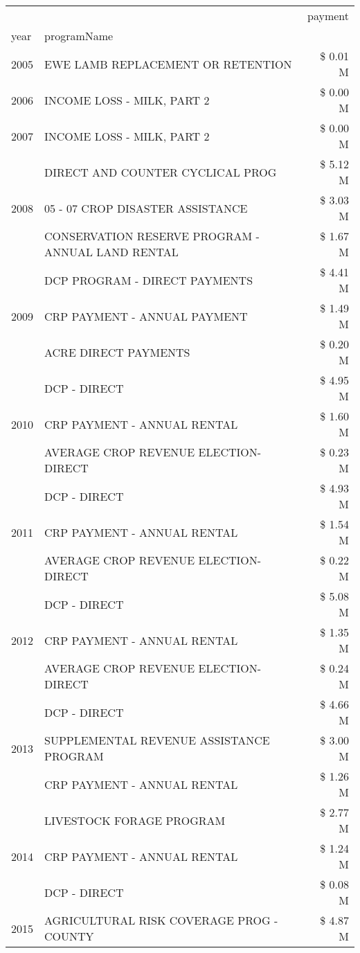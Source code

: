 \begin{tabular}{llr}
\toprule
 &  & payment \\
year & programName &  \\
\midrule
2005 & EWE LAMB REPLACEMENT OR RETENTION & \$ 0.01 M \\
\cline{1-3}
2006 & INCOME LOSS - MILK, PART 2 & \$ 0.00 M \\
\cline{1-3}
2007 & INCOME LOSS - MILK, PART 2 & \$ 0.00 M \\
\cline{1-3}
\multirow[t]{3}{*}{2008} & DIRECT AND COUNTER CYCLICAL PROG & \$ 5.12 M \\
 & 05 - 07 CROP DISASTER ASSISTANCE & \$ 3.03 M \\
 & CONSERVATION RESERVE PROGRAM - ANNUAL LAND RENTAL & \$ 1.67 M \\
\cline{1-3}
\multirow[t]{3}{*}{2009} & DCP PROGRAM - DIRECT PAYMENTS & \$ 4.41 M \\
 & CRP PAYMENT - ANNUAL PAYMENT & \$ 1.49 M \\
 & ACRE DIRECT PAYMENTS & \$ 0.20 M \\
\cline{1-3}
\multirow[t]{3}{*}{2010} & DCP - DIRECT & \$ 4.95 M \\
 & CRP PAYMENT - ANNUAL RENTAL & \$ 1.60 M \\
 & AVERAGE CROP REVENUE ELECTION-DIRECT & \$ 0.23 M \\
\cline{1-3}
\multirow[t]{3}{*}{2011} & DCP - DIRECT & \$ 4.93 M \\
 & CRP PAYMENT - ANNUAL RENTAL & \$ 1.54 M \\
 & AVERAGE CROP REVENUE ELECTION-DIRECT & \$ 0.22 M \\
\cline{1-3}
\multirow[t]{3}{*}{2012} & DCP - DIRECT & \$ 5.08 M \\
 & CRP PAYMENT - ANNUAL RENTAL & \$ 1.35 M \\
 & AVERAGE CROP REVENUE ELECTION-DIRECT & \$ 0.24 M \\
\cline{1-3}
\multirow[t]{3}{*}{2013} & DCP - DIRECT & \$ 4.66 M \\
 & SUPPLEMENTAL REVENUE ASSISTANCE PROGRAM & \$ 3.00 M \\
 & CRP PAYMENT - ANNUAL RENTAL & \$ 1.26 M \\
\cline{1-3}
\multirow[t]{3}{*}{2014} & LIVESTOCK FORAGE PROGRAM & \$ 2.77 M \\
 & CRP PAYMENT - ANNUAL RENTAL & \$ 1.24 M \\
 & DCP - DIRECT & \$ 0.08 M \\
\cline{1-3}
\multirow[t]{3}{*}{2015} & AGRICULTURAL RISK COVERAGE PROG - COUNTY & \$ 4.87 M \\

\end{tabular}
